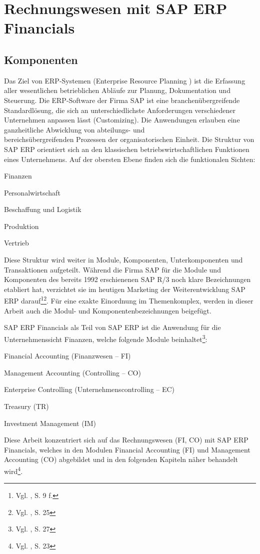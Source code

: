 \section{Rechnungswesen mit SAP ERP Financials}
\subsection{Komponenten}
Das Ziel von ERP-Systemen (Enterprise Resource Planning ) ist die Erfassung aller wesentlichen betrieblichen Abläufe zur Planung, Dokumentation und Steuerung. Die ERP-Software der Firma SAP ist eine branchenübergreifende Standardlösung, die sich an unterschiedlichste Anforderungen verschiedener Unternehmen anpassen lässt (Customizing). Die Anwendungen erlauben eine ganzheitliche Abwicklung von abteilungs- und\\bereichsübergreifenden Prozessen der organisatorischen Einheit. Die Struktur von SAP ERP orientiert sich an den klassischen betriebswirtschaftlichen Funktionen eines Unternehmens. Auf der obersten Ebene finden sich die funktionalen Sichten:
\begin{compactitem}
\item Finanzen
\item Personalwirtschaft
\item Beschaffung und Logistik
\item Produktion
\item Vertrieb
\end{compactitem}
Diese Struktur wird weiter in Module, Komponenten, Unterkomponenten und Transaktionen aufgeteilt. Während die Firma SAP für die Module und Komponenten des bereits 1992 erschienenen SAP R/3 noch klare Bezeichnungen etabliert hat, verzichtet sie im heutigen Marketing der Weiterentwicklung SAP ERP darauf\footnote{Vgl. \cite{Klein2010}, S. 9 f.}\footnote{Vgl. \cite{Hefner2001}, S. 25}. Für eine exakte Einordnung im Themenkomplex, werden in dieser Arbeit auch die Modul- und Komponentenbezeichnungen beigefügt.

SAP ERP Financials als Teil von SAP ERP ist die Anwendung für die Unternehmenssicht Finanzen, welche folgende Module beinhaltet\footnote{Vgl. \cite{Hefner2001}, S. 27}:
\begin{compactitem}
\item Financial Accounting (Finanzwesen -- FI)
\item Management Accounting (Controlling -- CO)
\item Enterprise Controlling (Unternehmenscontrolling -- EC)
\item Treasury (TR)
\item Investment Management (IM)
\end{compactitem}
Diese Arbeit konzentriert sich auf das Rechnungswesen (FI, CO) mit SAP ERP Financials, welches in den Modulen Financial Accounting (FI) und Management Accounting (CO) abgebildet und in den folgenden Kapiteln näher behandelt wird\footnote{Vgl. \cite{Patel2009}, S. 23}.

